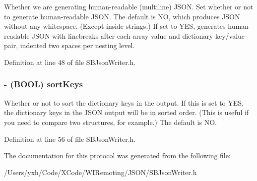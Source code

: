 Whether we are generating human-\/readable (multiline) JSON. Set whether or not to generate human-\/readable JSON. The default is NO, which produces JSON without any whitespace. (Except inside strings.) If set to YES, generates human-\/readable JSON with linebreaks after each array value and dictionary key/value pair, indented two spaces per nesting level. 

Definition at line 48 of file SBJsonWriter.h.\hypertarget{protocol_s_b_json_writer-p_ad424f1c19aead35d04509bfa549f7290}{
\subsubsection[{sortKeys}]{\setlength{\rightskip}{0pt plus 5cm}-\/ (BOOL) sortKeys}}
\label{protocol_s_b_json_writer-p_ad424f1c19aead35d04509bfa549f7290}


Whether or not to sort the dictionary keys in the output. If this is set to YES, the dictionary keys in the JSON output will be in sorted order. (This is useful if you need to compare two structures, for example.) The default is NO. 

Definition at line 56 of file SBJsonWriter.h.

The documentation for this protocol was generated from the following file:\begin{DoxyCompactItemize}
\item 
/Users/yxh/Code/XCode/WIRemoting/JSON/SBJsonWriter.h\end{DoxyCompactItemize}
